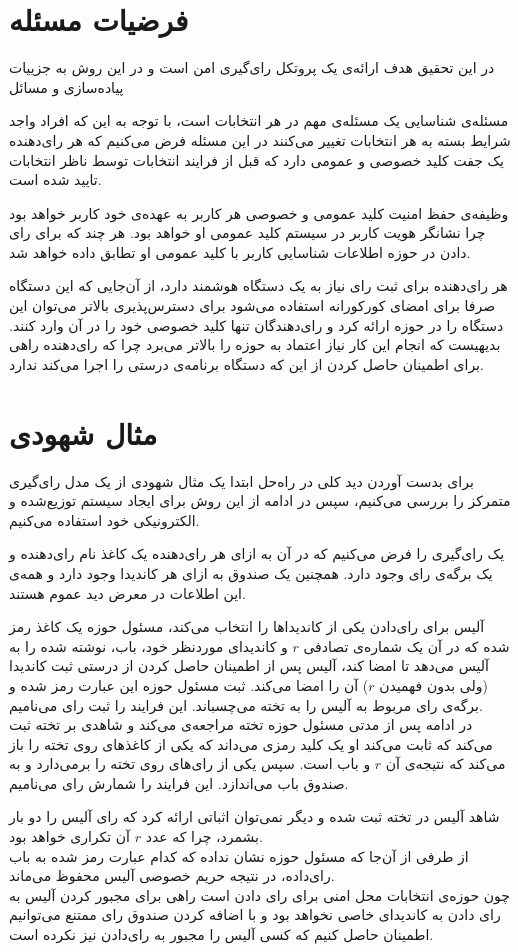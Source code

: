 \section{فرضیات مسئله}
در این تحقیق هدف ارائه‌ی یک پروتکل رای‌گیری امن است و در این روش به جزییات پیاده‌سازی و مسائل 
\par
مسئله‌ی شناسایی یک مسئله‌ی مهم در هر انتخابات است، با توجه به این که افراد واجد شرایط بسته به هر انتخابات تغییر می‌کنند در این مسئله فرض می‌کنیم که هر رای‌دهنده یک جفت کلید خصوصی و عمومی دارد که قبل از فرایند انتخابات توسط ناظر انتخابات تایید شده است. 
\par
وظیفه‌ی حفظ امنیت کلید عمومی و خصوصی هر کاربر به عهده‌ی خود کاربر خواهد بود چرا نشانگر هویت کاربر در سیستم‌ کلید عمومی او خواهد بود. هر چند که برای رای دادن در حوزه اطلاعات شناسایی کاربر با کلید عمومی او تطابق داده خواهد شد.
\par
هر رای‌دهنده برای ثبت رای نیاز به یک دستگاه هوشمند دارد، از آن‌جایی که این دستگاه صرفا برای امضای کورکورانه استفاده می‌شود برای دسترس‌پذیری بالاتر می‌توان این دستگاه را در حوزه ارائه کرد و رای‌دهندگان تنها کلید خصوصی خود را در آن وارد کنند. بدیهیست که انجام این کار نیاز اعتماد به حوزه را بالاتر می‌برد چرا که رای‌دهنده راهی برای اطمینان حاصل کردن از این که دستگاه برنامه‌ی درستی را اجرا می‌کند ندارد.

\section{مثال شهودی}
برای بدست آوردن دید کلی در راه‌حل ابتدا یک مثال شهودی از یک مدل رای‌گیری متمرکز را بررسی می‌کنیم،‌ سپس در ادامه از این روش برای ایجاد سیستم توزیع‌شده و الکترونیکی خود استفاده می‌کنیم.
\par
یک رای‌گیری را فرض می‌کنیم که در آن به ازای هر رای‌دهنده یک کاغذ نام رای‌دهنده و یک برگه‌ی رای وجود دارد. همچنین یک صندوق به ازای هر کاندیدا وجود دارد و همه‌ی این اطلاعات در معرض دید عموم هستند. 
\par
آلیس برای رای‌دادن یکی از کاندیداها را انتخاب می‌کند، مسئول حوزه یک کاغذ رمز شده که در آن یک شماره‌ی تصادفی $r$ و کاندیدای موردنظر خود، باب، نوشته شده را به آلیس می‌دهد تا امضا کند، آلیس پس از اطمینان حاصل کردن از درستی ثبت کاندیدا (ولی بدون فهمیدن $r$) آن را امضا می‌کند. ثبت مسئول حوزه این عبارت رمز شده و برگه‌ی رای مربوط به آلیس را به تخته می‌چسباند. این فرایند را ثبت رای‌ می‌نامیم.
\\
در ادامه پس از مدتی مسئول حوزه تخته مراجعه‌ی می‌کند و شاهدی بر تخته ثبت می‌کند که ثابت می‌کند او یک کلید رمزی می‌داند که یکی از کاغذ‌های روی تخته را باز می‌کند که نتیجه‌ی آن $r$ و باب است. سپس یکی از رای‌های روی تخته را برمی‌دارد و به صندوق باب می‌اندازد. این فرایند را شمارش رای‌ می‌نامیم.
\par
 شاهد آلیس در تخته ثبت شده و دیگر نمی‌توان اثباتی ارائه کرد که رای آلیس را دو بار بشمرد، چرا که عدد $r$ آن تکراری خواهد بود.
\\
از طرفی از آن‌جا که مسئول حوزه نشان نداده که کدام عبارت رمز شده به باب رای‌داده، در نتیجه حریم خصوصی آلیس محفوظ می‌ماند.
\\ 
چون حوزه‌ی انتخابات محل امنی برای رای‌ دادن است راهی برای مجبور کردن آلیس به رای دادن به کاندیدای خاصی نخواهد بود و با اضافه کردن صندوق رای ممتنع می‌توانیم اطمینان حاصل کنیم که کسی آلیس را مجبور به رای‌دادن نیز نکرده است. 


